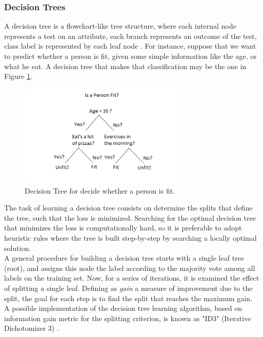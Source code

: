 \subsubsection{Decision Trees}
A decision tree is a flowchart-like tree structure, where each internal node represents a test on an attribute, each branch represents an outcome of the test, class label is represented by each leaf node \cite{article-decisiontrees}. For instance, suppose that we want to predict whether a person is fit, given some simple information like the age, or what he eat. A decision tree that makes that classification may be the one in Figure \ref{fig:decision-tree}.

\begin{figure}[ht]
	\centering
	\includegraphics[width=0.7\textwidth]{figures/decision-tree.png}
	\caption{Decision Tree for decide whether a person is fit.}
	\label{fig:decision-tree}
\end{figure}

The task of learning a decision tree consists on determine the splits that define the tree, such that the loss is minimized. Searching for the optimal decision tree that minimizes the loss is computationally hard, so it is preferable to adopt heuristic rules where the tree is built step-by-step by searching a locally optimal solution. \\
A general procedure for building a decision tree starts with a single leaf tree (root), and assigns this node the label according to the majority vote among all labels on the training set. Now, for a series of iterations, it is examined the effect of splitting a single leaf. Defining as \textit{gain} a measure of improvement due to the split, the goal for each step is to find the split that reaches the maximum gain.\\
A possible implementation of the decision tree learning algorithm, based on information gain metric for the splitting criterion, is known as "ID3" (Iterative Dichotomizer 3) \cite{inproceedings-id3}. 





